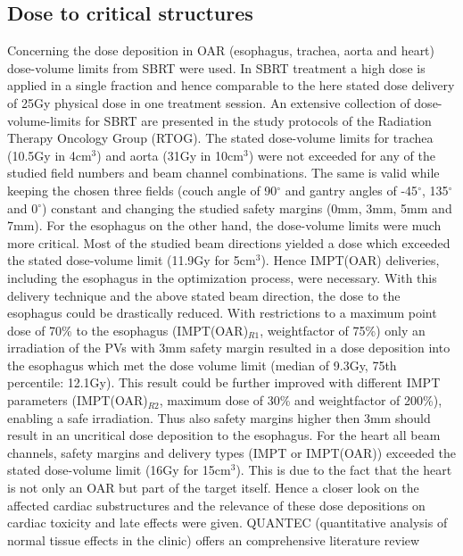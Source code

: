 \subsection{Dose to critical structures}
\label{Discussion:doseOAR}

Concerning the dose deposition in OAR (esophagus, trachea, aorta and heart) dose-volume limits from SBRT were used. In SBRT 
treatment a high dose is applied in a single fraction and hence comparable to the here stated dose delivery of 25Gy physical 
dose in one treatment session. 
An extensive collection of dose-volume-limits for SBRT are presented in the study protocols of the Radiation Therapy Oncology Group (RTOG). 
The stated dose-volume limits for trachea (10.5Gy in 4cm$^{3}$) and aorta (31Gy in 10cm$^{3}$) were not exceeded for any of the studied field 
numbers and beam channel combinations. The same is valid while keeping the chosen three fields (couch angle of 90$^{\circ}$ 
and gantry angles of -45$^{\circ}$, 135$^{\circ}$ and 0$^{\circ}$) constant and changing the studied safety margins (0mm, 3mm, 5mm and 7mm). 
For the esophagus on the other hand, the dose-volume limits were much more critical. Most of the studied beam directions yielded a dose 
which exceeded the stated dose-volume limit (11.9Gy for 5cm$^{3}$). Hence IMPT(OAR) deliveries, including the esophagus in the 
optimization process, were necessary. With this delivery technique and the above stated beam direction, the dose to the esophagus could be 
drastically reduced. With restrictions to a maximum point dose of 70\% to the esophagus (IMPT(OAR)$_{R1}$, weightfactor of 75\%) only an 
irradiation of the PVs with 3mm safety margin resulted in a dose deposition into the esophagus which met the dose volume limit 
(median of 9.3Gy, 75th percentile: 12.1Gy). This result could be further improved with different IMPT parameters (IMPT(OAR)$_{R2}$, 
maximum dose of 30\% and weightfactor of 200\%), enabling a safe irradiation. Thus also safety margins higher then 3mm should result in an 
uncritical dose deposition to the esophagus. 
For the heart all beam channels, safety margins and delivery types (IMPT or IMPT(OAR)) exceeded the stated dose-volume limit (16Gy for 
15cm$^{3}$). This is due to the fact that the heart is not only an OAR but part of the target itself. Hence a closer look on the affected 
cardiac substructures and the relevance of these dose depositions on cardiac toxicity and late effects were given.\newline
\newline
QUANTEC (quantitative analysis of normal tissue effects in the clinic) \cite{QUANTEC10} offers an comprehensive literature review 
